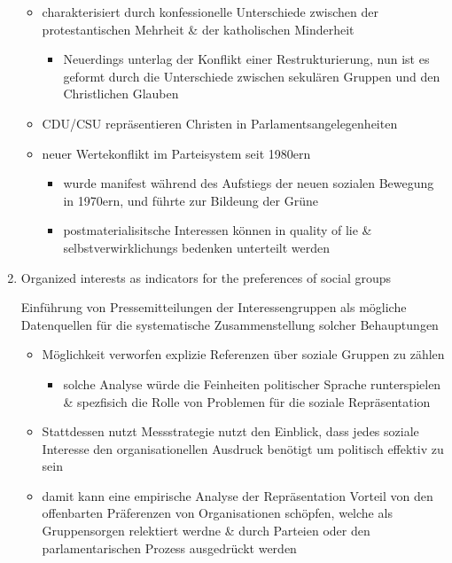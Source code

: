 \documentclass[11pt]{article}
\begin{document}
\begin{enumerate}
\begin{itemize}
\item charakterisiert durch konfessionelle Unterschiede zwischen der protestantischen Mehrheit \& der katholischen Minderheit 
\begin{itemize}
\item Neuerdings unterlag der Konflikt einer Restrukturierung, nun ist es geformt durch die Unterschiede zwischen sekulären Gruppen und den Christlichen Glauben
\end{itemize}
\item CDU/CSU repräsentieren Christen in Parlamentsangelegenheiten
\item neuer Wertekonflikt im Parteisystem seit 1980ern 
\begin{itemize}
\item wurde manifest während des Aufstiegs der neuen sozialen Bewegung in 1970ern, und führte zur Bildeung der Grüne
\item postmaterialisitsche Interessen können in quality of lie \& selbstverwirklichungs bedenken unterteilt werden
\end{itemize}
\end{itemize}

\item Organized interests as indicators for the preferences of social groups
\label{sec:org65ed649}

Einführung von Pressemitteilungen der Interessengruppen als mögliche Datenquellen für die systematische Zusammenstellung solcher Behauptungen 

\begin{itemize}
\item Möglichkeit verworfen explizie Referenzen über soziale Gruppen zu zählen 
\begin{itemize}
\item solche Analyse würde die Feinheiten politischer Sprache runterspielen \& spezfisich die Rolle von Problemen für die soziale Repräsentation
\end{itemize}
\item Stattdessen nutzt Messstrategie nutzt den Einblick, dass jedes soziale Interesse den organisationellen Ausdruck benötigt um politisch effektiv zu sein
\item damit kann eine empirische Analyse der Repräsentation Vorteil von den offenbarten Präferenzen von Organisationen schöpfen, welche als Gruppensorgen relektiert werdne \& durch Parteien oder den parlamentarischen Prozess ausgedrückt werden
\end{itemize}


\end{enumerate}
\end{document}
